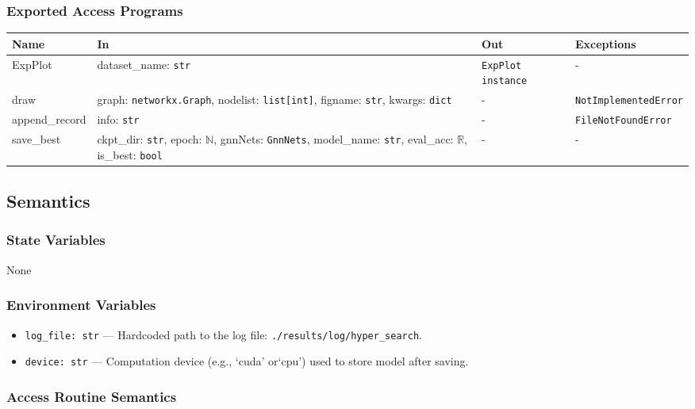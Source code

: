 \documentclass[12pt, titlepage]{article}
\begin{document}
\subsubsection{Exported Access Programs}
\begin{center}
\begin{tabular}{p{3.2cm} >{\raggedright\arraybackslash}p{6cm} p{3.5cm} p{3.3cm}}
\hline
\textbf{Name} & \textbf{In} & \textbf{Out} & \textbf{Exceptions} \\
\hline
ExpPlot & dataset\_name: \texttt{str} & \texttt{ExpPlot instance} & - \\
draw & graph: \texttt{networkx.Graph}, nodelist: \texttt{list[int]}, figname: \texttt{str}, kwargs: \texttt{dict} & - & \texttt{NotImplementedError} \\
append\_record & info: \texttt{str} & - & \texttt{FileNotFoundError} \\
save\_best & ckpt\_dir: \texttt{str}, epoch: \(\mathbb{N}\), gnnNets: \texttt{GnnNets}, model\_name: \texttt{str}, eval\_acc: \(\mathbb{R}\), is\_best: \texttt{bool} & - & - \\
\hline
\end{tabular}
\end{center}

\subsection{Semantics}

\subsubsection{State Variables}
None

\subsubsection{Environment Variables}
\begin{itemize}
  \item \texttt{log\_file: str} — Hardcoded path to the log file: \texttt{./results/log/hyper\_search}.
  \item \texttt{device: str} — Computation device (e.g., `cuda' or`cpu') used to store model after saving.
\end{itemize}

\subsubsection{Access Routine Semantics}
\end{document}
